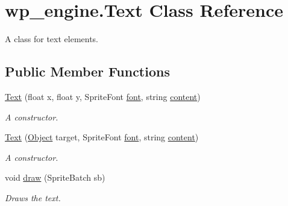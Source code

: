 \hypertarget{classwp__engine_1_1_text}{\section{wp\-\_\-engine.\-Text Class Reference}
\label{classwp__engine_1_1_text}
}


A class for text elements.  


\subsection*{Public Member Functions}
\begin{DoxyCompactItemize}
\item 
\hyperlink{classwp__engine_1_1_text_af3b9d3ba4bb3d3e589f7e32c02afd15c}{Text} (float x, float y, Sprite\-Font \hyperlink{classwp__engine_1_1_text_ac86929184c1426972dc3f0cdb768b3dc}{font}, string \hyperlink{classwp__engine_1_1_text_af48a92c9e88bc3c187ca8d807aa74cdd}{content})
\begin{DoxyCompactList}\small\item\em A constructor. \end{DoxyCompactList}\item 
\hyperlink{classwp__engine_1_1_text_af7139bad6c7931be5332e1efd2ed5a96}{Text} (\hyperlink{classwp__engine_1_1_object}{Object} target, Sprite\-Font \hyperlink{classwp__engine_1_1_text_ac86929184c1426972dc3f0cdb768b3dc}{font}, string \hyperlink{classwp__engine_1_1_text_af48a92c9e88bc3c187ca8d807aa74cdd}{content})
\begin{DoxyCompactList}\small\item\em A constructor. \end{DoxyCompactList}\item 
void \hyperlink{classwp__engine_1_1_text_aa8beb7b64ad8605ed1a0a2b3f602fa4f}{draw} (Sprite\-Batch sb)
\begin{DoxyCompactList}\small\item\em Draws the text. \end{DoxyCompactList}\end{DoxyCompactItemize}
